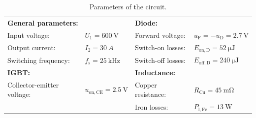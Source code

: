 %
\begin{table}[ht]
	\centering  %
	\begin{tabular}{llll}
		\toprule
		\multicolumn{2}{l}{\textbf{General parameters:}} & \multicolumn{2}{l}{\textbf{Diode:}}                                                                                         \\
		Input voltage:                                   & $U_{\mathrm{1}} = \SI{600}{\volt}$              & Forward voltage:   & $u_{\mathrm{F}} = -u_{\mathrm{D}}=\SI{2.7}{\volt}$   \\
		Output current:                                  & $I_2 = \SI{30}{A}$                              & Switch-on losses:  & $E_{\text{on},\mathrm{D}} = \SI{52}{\micro\joule}$   \\
		Switching frequency:                             & $f_{\mathrm{s}} = \SI{25}{\kilo\hertz}$         & Switch-off losses: & $E_{\text{off},\mathrm{D}} = \SI{240}{\micro\joule}$ \\
		\midrule
		\multicolumn{2}{l}{\textbf{IGBT:}}               & \multicolumn{2}{l}{\textbf{Inductance:}}                                                                                    \\
		Collector-emitter voltage:                       & $u_{\mathrm{on},\mathrm{CE}} = \SI{2.5}{\volt}$ & Copper resistance: & $R_{\text{Cu}} = \SI{45}{\milli\ohm}$                \\
		                                                 &                                                 & Iron losses:       & $P_{\mathrm{l},\text{Fe}} = \SI{13}{\watt}$          \\
		\bottomrule
	\end{tabular}
	\caption{Parameters of the circuit.}  %
	\label{table:ex01_Parameters of the circuit}
\end{table}
%



